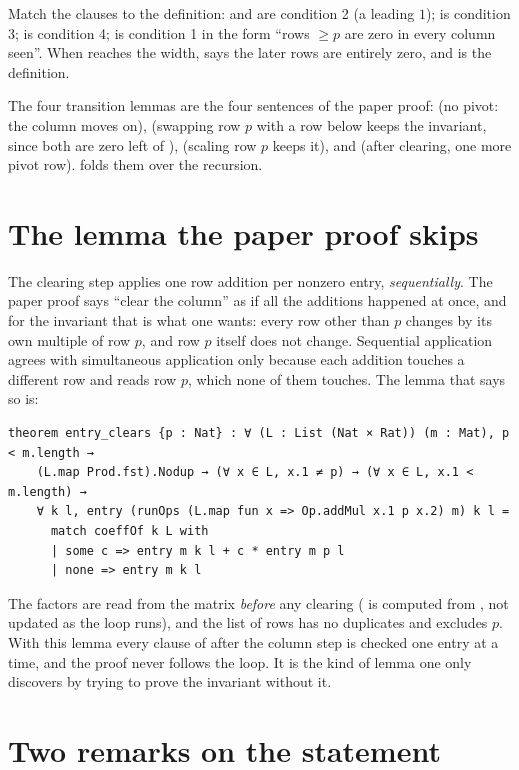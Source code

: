 Match the clauses to the definition:  and  are condition 2 (a leading $1$);
 is condition 3;  is condition 4;  is condition 1 in the form
``rows $\ge p$ are zero in every column seen''. When  reaches the width,  says
the later rows are entirely zero, and  is the definition.

The four transition lemmas are the four sentences of the paper proof:  (no
pivot: the column moves on),  (swapping row $p$ with a row below keeps the
invariant, since both are zero left of ),  (scaling row $p$ keeps it),
and  (after clearing, one more pivot row).  folds them over the
recursion.

\section{The lemma the paper proof skips}

The clearing step applies one row addition per nonzero entry, \emph{sequentially}. The paper proof
says ``clear the column'' as if all the additions happened at once, and for the invariant that
is what one wants: every row other than $p$ changes by its own multiple of row $p$, and row $p$
itself does not change. Sequential application agrees with simultaneous application only because
each addition touches a different row and reads row $p$, which none of them touches. The lemma
that says so is:

\begin{verbatim}
theorem entry_clears {p : Nat} : ∀ (L : List (Nat × Rat)) (m : Mat), p < m.length →
    (L.map Prod.fst).Nodup → (∀ x ∈ L, x.1 ≠ p) → (∀ x ∈ L, x.1 < m.length) →
    ∀ k l, entry (runOps (L.map fun x => Op.addMul x.1 p x.2) m) k l =
      match coeffOf k L with
      | some c => entry m k l + c * entry m p l
      | none => entry m k l
\end{verbatim}

The factors are read from the matrix \emph{before} any clearing ( is computed from
, not updated as the loop runs), and the list of rows has no duplicates and excludes $p$.
With this lemma every clause of  after the column step is checked one entry at a time,
and the proof never follows the loop. It is the kind of lemma one only discovers by trying to
prove the invariant without it.

\section{Two remarks on the statement}

